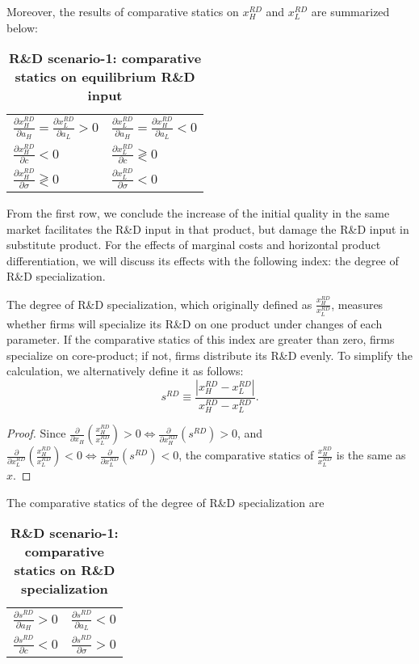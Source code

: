 \documentclass[12pt]{article}
\begin{document}
Moreover, the results of comparative statics on $x_H^{RD}$ and $x_L^{RD}$ are summarized below:
\begin{table}[h]
    \caption{\textbf{R\&D scenario-1: comparative statics on equilibrium R\&D input}}
    \label{tab:rd_com}
    \begin{center}
    \begin{tabular}{ll}
        $\frac{\partial x_H^{RD}}{\partial a_H} = \frac{\partial x_L^{RD}}{\partial a_L} > 0$ & $\frac{\partial x_L^{RD}}{\partial a_H} = \frac{\partial x_H^{RD}}{\partial a_L} < 0$ \\
        $\frac{\partial x_H^{RD}}{\partial c} < 0$ & $\frac{\partial x_L^{RD}}{\partial c} \gtrless 0$ \\
        $\frac{\partial x_H^{RD}}{\partial \sigma} \gtrless 0$ & $\frac{\partial x_L^{RD}}{\partial \sigma} < 0$ \\
    \end{tabular}
    \end{center}
\end{table}

From the first row, we conclude the increase of the initial quality in the same market facilitates the R\&D input in that product, but damage the R\&D input in substitute product.
For the effects of marginal costs and horizontal product differentiation, we will discuss its effects with the following index: the degree of R\&D specialization.

The degree of R\&D specialization, which originally defined as $\frac{x_H^{RD}}{x_L^{RD}}$, measures whether firms will specialize its R\&D on one product under changes of each parameter. 
If the comparative statics of this index are greater than zero, firms specialize on core-product; if not, firms distribute its R\&D evenly. 
To simplify the calculation, we alternatively define it as follows:
\begin{equation}
    s^{RD} \equiv \frac{|x_H^{RD} - x_L^{RD}|}{x_H^{RD} - x_L^{RD}}.
    \label{eq:rd_special}
\end{equation}
\begin{proof}
  Since $\frac{\partial}{\partial x_H} \left( \frac{x_H^{RD}}{x_L^{RD}} \right) > 0 \iff \frac{\partial}{\partial x_H^{RD}} (s^{RD}) > 0$, and $\frac{\partial}{\partial x_L^{RD}} \left( \frac{x_H^{RD}}{x_L^{RD}} \right) < 0 \iff \frac{\partial}{\partial x_L^{RD}} (s^{RD}) < 0$, the comparative statics of $\frac{x_H^{RD}}{x_L^{RD}}$ is the same as $x$.
\end{proof}
The comparative statics of the degree of R\&D specialization are
\begin{table}[h]
    \centering
    \caption{\textbf{R\&D scenario-1: comparative statics on R\&D specialization}}
    \label{tab:rd_special}
    \begin{tabular}{ll}
      $\frac{\partial s^{RD}}{\partial a_H} > 0$ & $\frac{\partial s^{RD}}{\partial a_L} < 0$ \\
      $\frac{\partial s^{RD}}{\partial c} < 0$ & $\frac{\partial s^{RD}}{\partial \sigma} > 0$ \\
    \end{tabular}
\end{table}
\end{document}
